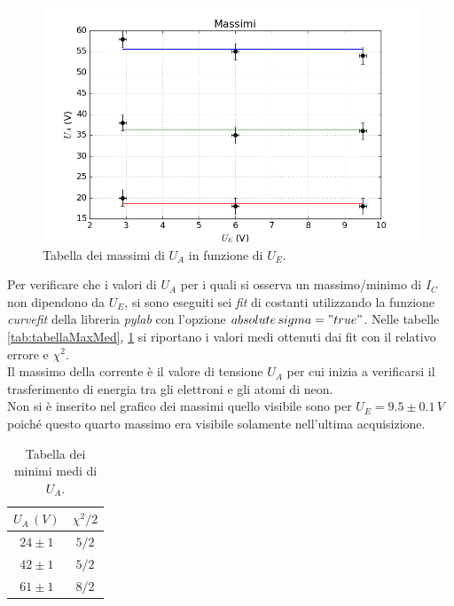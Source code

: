 \documentclass[10pt,a4paper]{article}
\begin{document}
\begin{figure}[!htb]
  \centering
  \includegraphics[scale=.7]{max.png}
\caption{Tabella dei massimi di $U_A$ in funzione di $U_E$.\label{graficoMax}}

\end{figure}

Per verificare che i valori di $U_A$ per i quali si osserva un massimo/minimo di $I_C$ non dipendono da $U_E$, si sono eseguiti sei \emph{fit} di costanti utilizzando la funzione \emph{curvefit} della libreria \emph{pylab} con l'opzione \emph{$absolute\,sigma = "true"$}. Nelle tabelle \ref{tab:tabellaMaxMed}, \ref{tab:tabellaMinMed} si riportano i valori medi ottenuti dai fit con il relativo errore e $\chi^2$.\\
Il massimo della corrente è il valore di tensione $U_A$ per cui inizia a verificarsi il trasferimento di energia tra gli elettroni e gli atomi di neon.\\
Non si è inserito nel grafico dei massimi quello visibile sono per $U_E=9.5\pm0.1\,V$ poiché questo quarto massimo era visibile solamente nell'ultima acquisizione.\\


\begin{table}[!htb]
\centering
\begin{tabular}{|c|c|}
\hline 
$U_A\,(V)$ & $\chi^2 /2$ \\ 
\hline 
$24\pm1$ & $5/2$ \\ 
\hline 
$42\pm1$ & $5/2$ \\ 
\hline 
$61\pm1$ & $8/2$ \\ 
\hline 
\end{tabular}
\caption{Tabella dei minimi medi di $U_A$.\label{tab:tabellaMinMed}}

\end{table}
\end{document}

